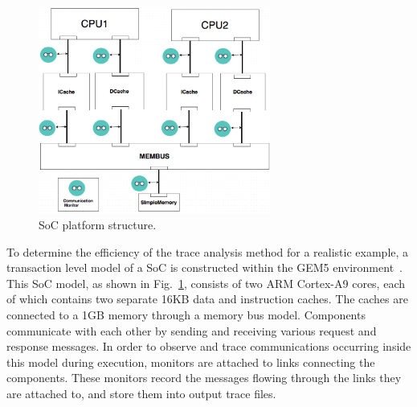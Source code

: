 \documentclass[conference]{IEEEtran}
\begin{document}


\begin{figure} 
\centerline{
\includegraphics[width=3in]{figures/Fig4.png}}
\caption{SoC platform structure.}
\label{SoC}
\end{figure}

To determine the efficiency of the trace analysis method for
a realistic example, a transaction level model of a SoC is
constructed within the GEM5 environment~\cite{Binkert2011}.
This SoC model, as shown in Fig.~\ref{SoC}, consists of two
ARM Cortex-A9 cores, each of which contains two separate
16KB data and instruction caches.  The caches are connected
to a 1GB memory through a memory bus model.  Components
communicate with each other by sending and receiving various
request and response messages.  In order to observe and
trace communications occurring inside this model during
execution, monitors are attached to links connecting the
components.  These monitors record the messages flowing
through the links they are attached to, and store them into
output trace files.
\end{document}
